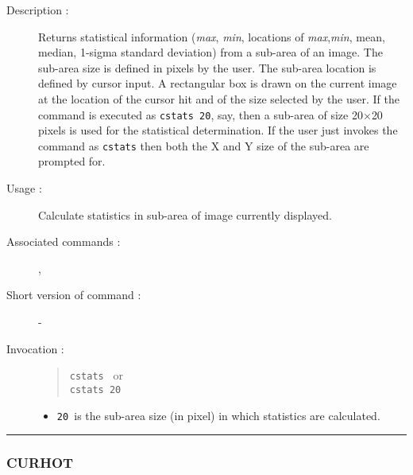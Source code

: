 \begin{description}

\item[Description :] Returns statistical information ({\it max},{\it
min}, locations of {\it max},{\it min}, mean, median, 1-sigma standard
deviation) from a sub-area of an image.  The sub-area size is defined
in pixels by the user.  The sub-area location is defined by cursor
input.  A rectangular box is drawn on the current image at the location
of the cursor hit and of the size selected by the user.  If the command
is executed as {\tt cstats~20}, say, then a sub-area of size
20$\times$20 pixels is used for the statistical determination.  If the
user just invokes the command as {\tt cstats} then both the X and Y
size of the sub-area are prompted for.

\item[Usage :] Calculate statistics in sub-area of image currently displayed.
\item[Associated commands :] {\tt {}},
{\tt {}}
\item[Short version of command :] -
\item[Invocation :]

\begin{quote}{\tt  cstats }
or \\
{\tt cstats 20 }
\end{quote}

\begin{itemize}

\item {\tt 20 }is the sub-area size (in pixel) in which statistics are
calculated.

\end{itemize}

\end{description}

\hrule
\subsubsection*{\label{CURHOT}CURHOT}

